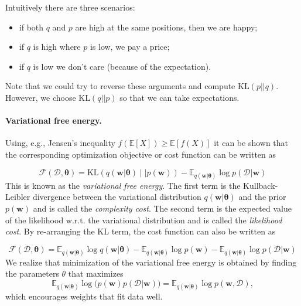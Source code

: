 \documentclass[%
oneside,                 %
final,                   %
10pt]{article}
\begin{document}
Intuitively there are three scenarios:
\begin{itemize}
\item if both $q$ and $p$ are high at the same positions, then we are happy;

\item if $q$ is high where $p$ is low, we pay a price;

\item if $q$ is low we don't care (because of the expectation).
\end{itemize}

\noindent
Note that we could try to reverse these arguments and compute $\mathrm{KL}(p||q)$. However, we choose $\mathrm{KL}(q||p)$ so that we can take expectations.

\paragraph{Variational free energy.}
Using, e.g., Jensen's inequality $f(\mathbb{E}[X]) \ge \mathbb{E}[f(X)]$
it can be shown that the corresponding optimization objective or cost function can be written as

\[ \mathcal{F}(\mathcal{D},\boldsymbol{\theta}) =
\mathrm{KL}(q(\mathbf{w} \lvert \boldsymbol{\theta}) \mid\mid p(\mathbf{w})) -
\mathbb{E}_{q(\mathbf{w} \lvert \boldsymbol{\theta})} \log p(\mathcal{D} \lvert \mathbf{w})
\tag{1} \]
This is known as the \emph{variational free energy}. The first term is the Kullback-Leibler divergence between the variational distribution $q(\mathbf{w} \lvert \boldsymbol{\theta})$ and the prior $p(\mathbf{w})$ and is called the \emph{complexity cost}. The second term is the expected value of the likelihood w.r.t. the variational distribution and is called the \emph{likelihood cost}. By re-arranging the KL term, the cost function can also be written as

\[ \mathcal{F}(\mathcal{D},\boldsymbol{\theta}) =
\mathbb{E}_{q(\mathbf{w} \lvert \boldsymbol{\theta})} \log q(\mathbf{w} \lvert \boldsymbol{\theta}) -
\mathbb{E}_{q(\mathbf{w} \lvert \boldsymbol{\theta})} \log p(\mathbf{w}) -
\mathbb{E}_{q(\mathbf{w} \lvert \boldsymbol{\theta})} \log p(\mathcal{D} \lvert \mathbf{w})
\tag{2} \]
We realize that minimization of the variational free energy is obtained by finding the parameters $\theta$ that
maximizes
\[ \mathbb{E}_{q(\mathbf{w} \lvert \boldsymbol{\theta})} \log \big( p(\mathbf{w}) p(\mathcal{D} \lvert \mathbf{w}) \big) =
\mathbb{E}_{q(\mathbf{w} \lvert \boldsymbol{\theta})} \log p(\mathbf{w, \mathcal{D}}), \]
which encourages weights that fit data well.
\end{document}

